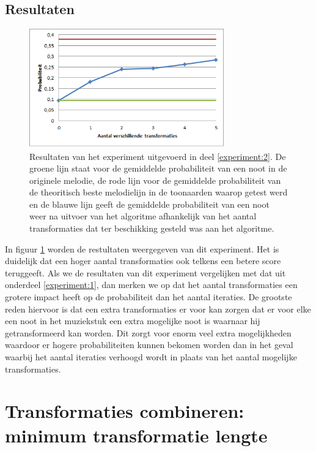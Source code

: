 \subsection{Resultaten}

\begin{figure}[!ht]
  \centering
  \includegraphics[width=0.75\textwidth]{5_Experimenten_Resultaten/exp2_res}
  \caption{Resultaten van het experiment uitgevoerd in deel \ref{experiment:2}. De groene lijn staat voor de gemiddelde probabiliteit van een noot in de originele melodie, de rode lijn voor de gemiddelde probabiliteit van de theoritisch beste melodielijn in de toonaarden waarop getest werd en de blauwe lijn geeft de gemiddelde probabiliteit van een noot weer na uitvoer van het algoritme afhankelijk van het aantal transformaties dat ter beschikking gesteld was aan het algoritme.}
  \label{figuur:exp2}
\end{figure}

In figuur \ref{figuur:exp2} worden de restultaten weergegeven van dit experiment. Het is duidelijk dat een  hoger aantal transformaties ook telkens een betere score teruggeeft. Als we de resultaten van dit experiment vergelijken met dat uit onderdeel \ref{experiment:1}, dan merken we op dat het aantal transformaties een grotere impact heeft op de probabiliteit dan het aantal iteraties. De grootste reden hiervoor is dat een extra transformaties er voor kan zorgen dat er voor elke een noot in het muziekstuk een extra mogelijke noot is waarnaar hij getransformeerd kan worden. Dit zorgt voor enorm veel extra mogelijkheden waardoor er hogere probabiliteiten kunnen bekomen worden dan in het geval waarbij het aantal iteraties verhoogd wordt in plaats van het aantal mogelijke transformaties.  


\section{Transformaties combineren: minimum transformatie lengte}
\label{experiment:3}
